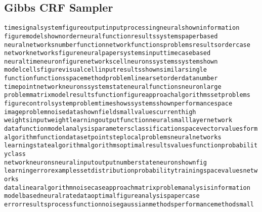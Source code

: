 \documentclass{article}
\begin{document}
\begin{spacing}{1.1}
\subsection{Gibbs CRF Sampler}
\begin{alltt}
  time signal system figure output input processing neural shown information
 figure model shown order neural function results systems paper based
 neural networks number function network functions problems results order case
 network networks figure neural paper systems input time case based
 neural time neuron figure networks cell neurons systems system shown
 model cells figure visual cell input results shown similar single
 function functions space method problem linear set order data number
 time point network neurons system state neural functions neuron large
 problem matrix model results function figure approach algorithms set problems
 figure control system problem time shows systems shown performance space
 image problem noise data shown field small values current high
 weights input weight learning output function neural small layer network
 data function model analysis parameters classification space vector values form
 algorithm function data set point step local problems neural networks
 learning state algorithm algorithms optimal results values function probability class
 network neurons neural input output number state neuron shown fig
 learning error examples set distribution probability training space values networks
 data linear algorithm noise case approach matrix problem analysis information
 model based neural rate data optimal figure analysis paper case
 error results process function noise gaussian methods performance method small
\end{alltt}


\end{spacing}
\end{document}
